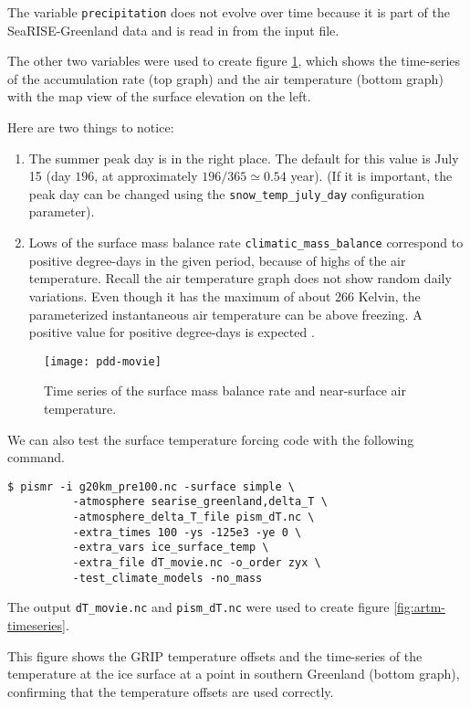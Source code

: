 \documentclass[titlepage,letterpaper,final]{scrartcl}
\begin{document}
The variable \texttt{precipitation} does not evolve over time because
it is part of the SeaRISE-Greenland data and is read in from the input file.

The other two variables were used to create figure \ref{fig:pddseries}, which
shows the time-series of the accumulation rate (top graph) and the air
temperature (bottom graph)  with the map view of the surface elevation on the left.

Here are two things to notice:
\begin{enumerate}
\item The summer peak day is in the right place.  The default for this value is
  July 15 (day $196$, at approximately $196/365 \simeq 0.54$ year).  (If it is
  important, the peak day can be changed using the \texttt{snow_temp_july_day}
  configuration parameter).

\item Lows of the surface mass balance rate \texttt{climatic_mass_balance} correspond to
  positive degree-days in the given period, because of highs of the air
  temperature.  Recall the air temperature graph does
  not show random daily variations.  Even though it has the maximum of about $266$
  Kelvin, the parameterized instantaneous air temperature can be above freezing.
  A positive value for positive degree-days is expected \cite{CalovGreve05}.
\end{enumerate}

\begin{figure}[ht]
  \centering
  \texttt{[image: pdd-movie]}
  \caption{Time series of the surface mass balance rate and near-surface air temperature.}
  \label{fig:pddseries}
\end{figure}

\bigskip
We can also test the surface temperature forcing code with the following command.
\begin{verbatim}
$ pismr -i g20km_pre100.nc -surface simple \
          -atmosphere searise_greenland,delta_T \
          -atmosphere_delta_T_file pism_dT.nc \
          -extra_times 100 -ys -125e3 -ye 0 \
          -extra_vars ice_surface_temp \
          -extra_file dT_movie.nc -o_order zyx \
          -test_climate_models -no_mass
\end{verbatim}
The output \texttt{dT_movie.nc} and \texttt{pism_dT.nc} were used to create figure \ref{fig:artm-timeseries}.

This figure shows the GRIP temperature offsets and the time-series of the temperature at the ice surface at a point in southern Greenland (bottom graph), confirming that the temperature offsets are used correctly.
\end{document}
